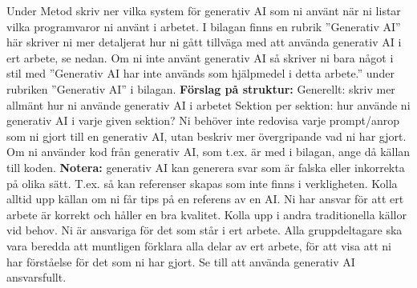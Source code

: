 \documentclass[a4paper]{article}
\begin{document}
Under Metod skriv ner vilka system för  generativ AI som ni använt när ni listar vilka programvaror ni använt i arbetet.
\newline
\newline
I bilagan finns en rubrik ”Generativ AI” här skriver ni mer detaljerat hur ni gått tillväga med att använda generativ AI i ert arbete, se nedan.
\newline
\newline
Om ni inte använt generativ AI så skriver ni bara något i stil med ”Generativ AI har inte används som hjälpmedel i detta arbete.” under rubriken ”Generativ AI” i bilagan.
\newline
\newline
\textbf{Förslag på struktur:}
\newline
Generellt: skriv mer allmänt hur ni använde generativ AI i arbetet
\newline
Sektion per sektion: hur använde ni generativ AI i varje given sektion?
\newline
\newline
Ni behöver inte redovisa varje prompt/anrop som ni gjort till en generativ AI, 
utan beskriv mer övergripande vad ni har gjort. Om ni använder kod från generativ AI,
som t.ex. är med i bilagan, ange då källan till koden.
\newline
\newline
\textbf{Notera:}  generativ AI kan generera svar som är falska eller inkorrekta på olika sätt. 
T.ex. så kan referenser skapas som inte finns i verkligheten. Kolla alltid upp 
källan om ni får tips på en referens av en AI. Ni har ansvar för att ert arbete
är korrekt och håller en bra kvalitet. Kolla upp i andra traditionella källor vid behov. Ni är ansvariga för det som står i ert arbete. 
\newline
\newline
Alla gruppdeltagare ska vara beredda att muntligen förklara alla delar av ert arbete, för att visa att ni har förståelse för det som ni har gjort.
\newline
\newline
Se till att använda generativ AI ansvarsfullt.
\end{document}
